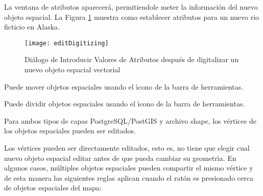 La ventana de atributos aparecer\'a, permitiendole meter la informaci\'on del nuevo objeto espacial.
La Figura \ref{fig:vector_digitising} muestra como establecer atributos para un nuevo rio ficticio
en Alaska.

\begin{figure}[ht]
   \begin{center}
   \caption{Di\'alogo de Introducir Valores de Atributos después de digitalizar un nuevo objeto espacial vectorial
   \nixcaption}\label{fig:vector_digitising}\smallskip
   \texttt{[image: editDigitizing]}
\end{center}  
\end{figure}

\begin{Tip}[ht]\caption{\textsc{Tipos de Valores de Atributos}}
\end{Tip}


Puede mover objetos espaciales usando el \'{\i}cono  
de la barra de herramientas.


Puede dividir objetos espaciales usando el \'{\i}cono 
de la barra de herramientas.


Para ambos tipos de capas PostgreSQL/PostGIS y  archivo shape, los v\'ertices de los objetos espaciales pueden ser editados. 

Los v\'ertices pueden ser directamente editados, esto es, no tiene
que elegir cual nuevo objeto espacial editar antes de que pueda cambiar
su geometr\'{\i}a.
En algunos casos, m\'ultiples objetos espaciales pueden compartir el mismo v\'ertice
y de esta manera las siguientes reglas aplican cuando el rat\'on es presionado
cerca de objetos espaciales del mapa:

